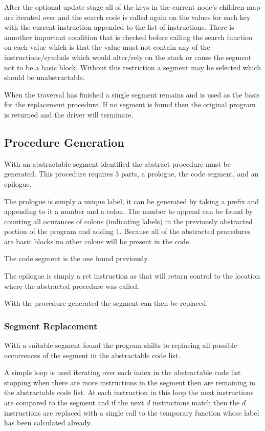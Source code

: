 \documentclass[9pt,nocopyrightspace]{sigplanconf}
\begin{document}
After the optional update stage all of the keys in the current node's children map are iterated over and the search code is called again on the values for each key with the current instruction appended to the list of instructions.
There is annother important condition that is checked before calling the search function on each value which is that the value must not contain any of the instructions/symbols which would alter/rely on the stack or cause the segment not to be a basic block.
Without this restriction a segment may be selected which should be unabstractable.

When the traversal has finished a single segment remains and is used as the basis for the replacement procedure.
If no segment is found then the original program is returned and the driver will terminate.

\subsection{Procedure Generation}

With an abstractable segment identified the abstract procedure must be generated.
This procedure requires 3 parts, a prologue, the code segment, and an epilogue.

The prologue is simply a unique label, it can be generated by taking a prefix and appending to it a number and a colon.
The number to append can be found by counting all ocurances of colons (indicating labels) in the previously abstracted portion of the program and adding 1.
Because all of the abstracted procedures are basic blocks no other colons will be present in the code.

The code segment is the one found previously.

The epilogue is simply a ret instruction as that will return control to the location where the abstracted procedure was called.

With the procedure generated the segment can then be replaced.

\subsubsection{Segment Replacement}

With a suitable segment found the program shifts to replacing all possible occurrences of the segment in the abstractable code list.

A simple loop is used iterating over each index in the abstractable code list stopping when there are more instructions in the segment then are remaining in the abstractable code list.
At each instruction in this loop the next instructions are compared to the segment and if the next $d$ instructions match then the $d$ instructions are replaced with a single call to the temporary function whose label has been calculated already.
\end{document}
